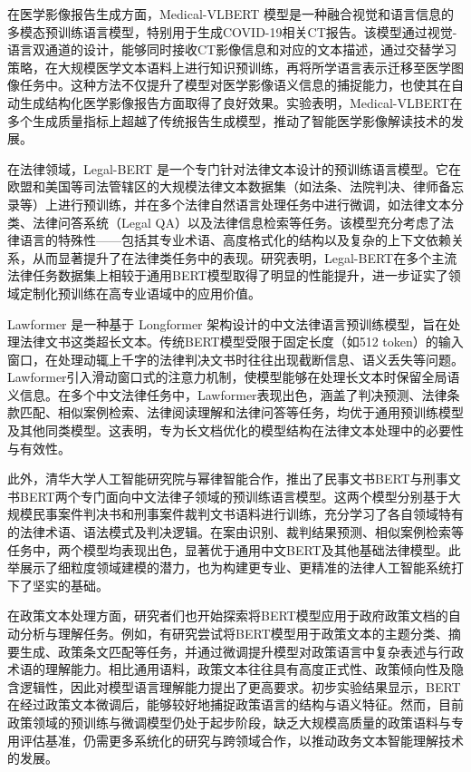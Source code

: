 \documentclass[12pt, a4paper]{ctexart}
\begin{document}
在医学影像报告生成方面，Medical-VLBERT 模型是一种融合视觉和语言信息的多模态预训练语言模型，特别用于生成COVID-19相关CT报告\cite{Liu_2021}。该模型通过视觉-语言双通道的设计，能够同时接收CT影像信息和对应的文本描述，通过交替学习策略，在大规模医学文本语料上进行知识预训练，再将所学语言表示迁移至医学图像任务中。这种方法不仅提升了模型对医学影像语义信息的捕捉能力，也使其在自动生成结构化医学影像报告方面取得了良好效果。实验表明，Medical-VLBERT在多个生成质量指标上超越了传统报告生成模型，推动了智能医学影像解读技术的发展。

在法律领域，Legal-BERT 是一个专门针对法律文本设计的预训练语言模型\cite{chalkidis2020legalbertmuppetsstraightlaw}。它在欧盟和美国等司法管辖区的大规模法律文本数据集（如法条、法院判决、律师备忘录等）上进行预训练，并在多个法律自然语言处理任务中进行微调，如法律文本分类、法律问答系统（Legal QA）以及法律信息检索等任务。该模型充分考虑了法律语言的特殊性——包括其专业术语、高度格式化的结构以及复杂的上下文依赖关系，从而显著提升了在法律类任务中的表现。研究表明，Legal-BERT在多个主流法律任务数据集上相较于通用BERT模型取得了明显的性能提升，进一步证实了领域定制化预训练在高专业语域中的应用价值。

Lawformer 是一种基于 Longformer 架构设计的中文法律语言预训练模型，旨在处理法律文书这类超长文本\cite{xiao2021lawformerpretrainedlanguagemodel}。传统BERT模型受限于固定长度（如512 token）的输入窗口，在处理动辄上千字的法律判决文书时往往出现截断信息、语义丢失等问题。Lawformer引入滑动窗口式的注意力机制，使模型能够在处理长文本时保留全局语义信息。在多个中文法律任务中，Lawformer表现出色，涵盖了判决预测、法律条款匹配、相似案例检索、法律阅读理解和法律问答等任务，均优于通用预训练模型及其他同类模型。这表明，专为长文档优化的模型结构在法律文本处理中的必要性与有效性。

此外，清华大学人工智能研究院与幂律智能合作，推出了民事文书BERT与刑事文书BERT两个专门面向中文法律子领域的预训练语言模型\cite{zhong2019openclap}。这两个模型分别基于大规模民事案件判决书和刑事案件裁判文书语料进行训练，充分学习了各自领域特有的法律术语、语法模式及判决逻辑。在案由识别、裁判结果预测、相似案例检索等任务中，两个模型均表现出色，显著优于通用中文BERT及其他基础法律模型。此举展示了细粒度领域建模的潜力，也为构建更专业、更精准的法律人工智能系统打下了坚实的基础。

在政策文本处理方面，研究者们也开始探索将BERT模型应用于政府政策文档的自动分析与理解任务。例如，有研究尝试将BERT模型用于政策文本的主题分类、摘要生成、政策条文匹配等任务，并通过微调提升模型对政策语言中复杂表述与行政术语的理解能力\cite{9849586}。相比通用语料，政策文本往往具有高度正式性、政策倾向性及隐含逻辑性，因此对模型语言理解能力提出了更高要求。初步实验结果显示，BERT在经过政策文本微调后，能够较好地捕捉政策语言的结构与语义特征。然而，目前政策领域的预训练与微调模型仍处于起步阶段，缺乏大规模高质量的政策语料与专用评估基准，仍需更多系统化的研究与跨领域合作，以推动政务文本智能理解技术的发展。
\end{document}
